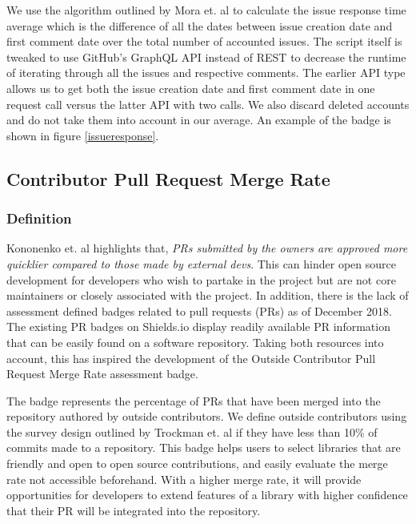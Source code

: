 \documentclass[12pt, letterpaper]{article}
\begin{document}
We use the algorithm outlined by Mora et. al \cite{metrics} to calculate the issue response time average which
is the difference of all the dates between issue creation date and first comment date over the total number of 
accounted issues. 
The script itself is tweaked to use GitHub's \cite{github} GraphQL API instead of REST to decrease the runtime of iterating through
all the issues and respective comments. The earlier API type allows us to get both the issue creation date and first
comment date in one request call versus the latter API with two calls.
We also discard deleted accounts and do not take them into account in our average.
An example of the badge is shown in figure \ref{issueresponse}.


\subsection{Contributor Pull Request Merge Rate}
\subsubsection{Definition}
Kononenko et. al \cite{shopifyarticle} highlights that, \textit{PRs submitted by the owners are approved more
quicklier compared to those made by external devs}. This can hinder open source development
for developers who wish to partake in the project but are not core maintainers or closely associated with the project.
In addition, there is the lack of assessment defined badges \cite{githubbadges} related to pull requests (PRs)
as of December 2018.
The existing PR badges on Shields.io \cite{shields} display readily available PR information that can be easily found on a 
software repository. Taking both resources \cite{shields, shopifyarticle} into account, this has inspired
the development of the Outside Contributor Pull Request Merge Rate assessment badge. 


The badge represents the percentage of PRs that have been merged into the repository authored by outside contributors.
We define outside contributors using the survey design outlined by Trockman et. al \cite{githubbadges} if they have 
less than 10\% of commits made to a repository.
This badge helps users to select libraries that are friendly and open to open source contributions,
and easily evaluate the merge rate not accessible beforehand.
With a higher merge rate, it will provide opportunities for developers to extend features of a library with 
higher confidence that their PR will be integrated into the repository.
\end{document}
